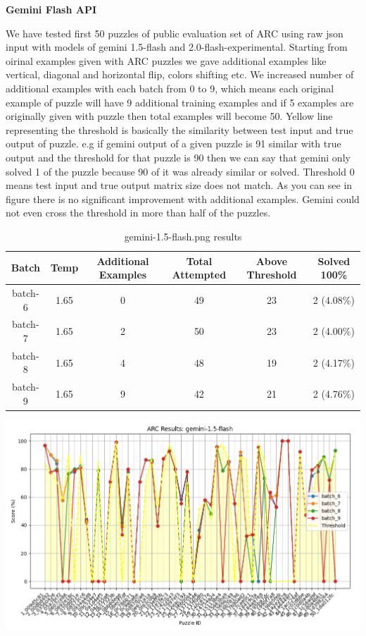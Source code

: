 \documentclass[11pt]{scrartcl}
\begin{document}
\begin{small}
\textbf{Gemini Flash API}
\end{small}
We have tested first 50 puzzles of public evaluation set of ARC using raw json input with models of gemini 1.5-flash and 2.0-flash-experimental. Starting from oirinal examples given with ARC puzzles we gave additional examples like vertical, diagonal and horizontal flip, colors shifting etc. We increased number of additional examples with each batch from 0 to 9, which means each original example of puzzle will have 9 additional training examples and if 5 examples are originally given with puzzle then total examples will become 50. Yellow line representing the threshold is basically the similarity between test input and true output of puzzle. e.g if gemini output of a given puzzle is 91 similar with true output and the threshold for that puzzle is 90 then we can say that gemini only solved 1 of the puzzle because 90 of it was already similar or solved. Threshold 0 means test input and true output matrix size does not match. As you can see in figure there is no significant improvement with additional examples. Gemini could not even cross the threshold in more than half of the puzzles.



\begin{table}[h]
    \centering
    \begin{tabular}{|c|c|c|c|c|c|}
        \hline
        Batch & Temp & Additional Examples & Total Attempted & Above Threshold & Solved 100\% \\ 
        \hline
        batch-6 & 1.65 & 0 & 49 & 23 & 2 (4.08\%)   \\ 
        batch-7 & 1.65 & 2 & 50 & 23 & 2 (4.00\%)   \\ 
        batch-8 & 1.65 & 4 & 48 & 19 & 2 (4.17\%)   \\ 
        batch-9 & 1.65 & 9 & 42 & 21 & 2 (4.76\%)   \\ 
        \hline
    \end{tabular}
    \caption{ gemini-1.5-flash.png results }
    \label{tab:example}
\end{table}

\includegraphics[width=0.99\linewidth, center]{gemini-1.5-flash.png}
\end{document}

